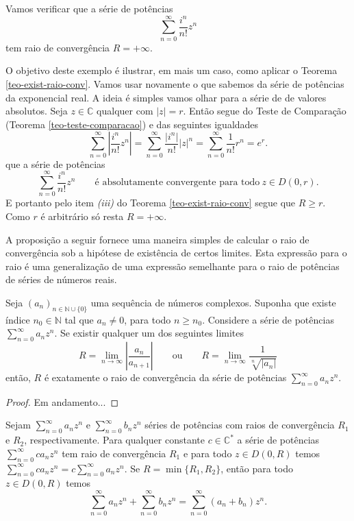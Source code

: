 \begin{exemplo}
Vamos verificar que a série de potências 
\[
\sum_{n=0}^{\infty} \frac{i^{n}}{n!}z^{n}
\]
tem raio de convergência $R=+\infty$. 

O objetivo deste exemplo é ilustrar, em mais um caso, 
como aplicar o Teorema \ref{teo-exist-raio-conv}.
Vamos usar novamente o que sabemos da série de potências da exponencial real.
A ideia é simples vamos olhar para a série de de valores absolutos.
Seja $z\in\mathbb{C}$ qualquer com $|z|=r$. Então segue do 
Teste de Comparação (Teorema \ref{teo-teste-comparacao}) e das seguintes igualdades
\[
\sum_{n=0}^{\infty}\left|  \frac{i^{n}}{n!}z^{n} \right|
=
\sum_{n=0}^{\infty} \frac{|i^{n}|}{n!}|z|^{n}
=
\sum_{n=0}^{\infty} \frac{1}{n!}r^{n}
=
e^{r}.
\]
que a série de potências 
\[
\sum_{n=0}^{\infty} \frac{i^{n}}{n!}z^{n}
\qquad \text{é absolutamente convergente para todo}\ z\in D(0,r).
\]
E portanto pelo item \textit{(iii)} do Teorema \ref{teo-exist-raio-conv}
segue que $R\geqslant r$. Como $r$ é arbitrário só resta $R=+\infty$.
\end{exemplo}


A proposição a seguir fornece uma maneira simples de calcular o
raio de convergência sob a hipótese de existência de certos limites.
Esta expressão para o raio é uma generalização de uma expressão semelhante
para o raio de potências de séries de números reais.

\begin{proposicao}
\label{prop-raio-raiz-n-razao}
Seja $(a_n)_{n\in\mathbb{N}\cup\{0\}}$ uma sequência de números complexos.
Suponha que existe índice $n_0\in\mathbb{N}$ tal que $a_n\neq 0$, 
para todo $n\geqslant n_0$. Considere a série
de potências $\sum_{n=0}^{\infty}a_nz^n$. Se existir
qualquer um dos seguintes limites
\[
R = \lim_{n\to\infty} \left|\frac{a_n}{a_{n+1}}\right|
\qquad \text{ou}\qquad
R = \lim_{n\to\infty} \frac{1}{\displaystyle \sqrt[n]{|a_n|}}
\]
então, $R$ é exatamente o raio de convergência
da série de potências $\sum_{n=0}^{\infty}a_nz^n$.
\end{proposicao} 

\begin{proof}
{\red Em andamento...}
\end{proof}


\begin{proposicao}
Sejam $\sum_{n=0}^{\infty}a_nz^n$ e $\sum_{n=0}^{\infty}b_nz^n$
séries de potências com raios de convergência $R_1$ e $R_2$,
respectivamente. Para qualquer constante $c\in\mathbb{C}^{*}$ 
a série de potências $\sum_{n=0}^{\infty}ca_nz^n$ tem raio 
de convergência $R_1$ e para todo $z\in D(0,R)$ temos 
$\sum_{n=0}^{\infty}ca_nz^n =c\sum_{n=0}^{\infty}a_nz^n$.
Se $R=\min\{R_1,R_2\}$, então para todo $z\in D(0,R)$ temos 
\[
\sum_{n=0}^{\infty}a_nz^n  + \sum_{n=0}^{\infty}b_nz^n = 
\sum_{n=0}^{\infty}(a_n+b_n)z^n.
\]
\end{proposicao}


